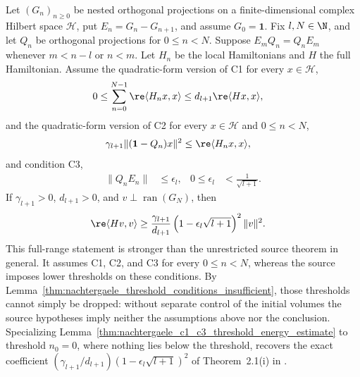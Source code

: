 \begin{lemma}
    \label{thm:nachtergaele_c1_c3_full_range_energy_estimate}
    \leanok
    Let $(G_n)_{n\geq0}$ be nested orthogonal projections on a
    finite-dimensional complex Hilbert space $\mathcal H$, put
    $E_n=G_n-G_{n+1}$, and assume $G_0=\mathbf 1$. Fix $l,N\in\N$, and let
    $Q_n$ be orthogonal projections
    for $0\leq n<N$. Suppose $E_mQ_n=Q_nE_m$ whenever $m<n-l$ or $n<m$.
    Let $H_n$ be the local Hamiltonians and $H$ the full Hamiltonian.
    Assume the quadratic-form version of C1 for every $x\in\mathcal H$,
    \begin{align}
        0
         & \leq\sum_{n=0}^{N-1}\re\langle H_nx,x\rangle
        \leq d_{l+1}\re\langle Hx,x\rangle,
        \label{eq:nachtergaele_c1_form}
    \end{align}
    and the quadratic-form version of C2 for every $x\in\mathcal H$ and
    $0\leq n<N$,
    \begin{align}
        \gamma_{l+1}\lVert(\mathbf 1-Q_n)x\rVert^2
         & \leq\re\langle H_nx,x\rangle,
        \label{eq:nachtergaele_c2_form}
    \end{align}
    and condition C3,
    \begin{align}
        \lVert Q_nE_n\rVert
         & \leq\epsilon_l,
         & 0\leq\epsilon_l
         & <\frac{1}{\sqrt{l+1}}.
        \label{eq:nachtergaele_c3_form}
    \end{align}
    If $\gamma_{l+1}>0$, $d_{l+1}>0$, and
    $v\perp\operatorname{ran}(G_N)$, then
    \begin{align}
        \re\langle Hv,v\rangle
         & \geq
        \frac{\gamma_{l+1}}{d_{l+1}}
        \left(1-\epsilon_l\sqrt{l+1}\right)^2\lVert v\rVert^2.
        \label{eq:nachtergaele_c1_c3_full_range_energy_estimate}
    \end{align}
    This full-range statement is stronger than the unrestricted source
    theorem in general. It assumes C1, C2, and C3 for every $0\leq n<N$,
    whereas the source imposes lower thresholds on these conditions. By
    Lemma~\ref{thm:nachtergaele_threshold_conditions_insufficient}, those
    thresholds cannot simply be dropped: without separate control of the
    initial volumes the source hypotheses imply neither the assumptions above
    nor the conclusion. Specializing
    Lemma~\ref{thm:nachtergaele_c1_c3_threshold_energy_estimate} to
    threshold $n_0=0$, where nothing lies below the threshold, recovers the
    exact coefficient $(\gamma_{l+1}/d_{l+1})(1-\epsilon_l\sqrt{l+1})^2$ of
    Theorem~2.1(i) in \cite{Nachtergaele1996Spectral}.
\end{lemma}

